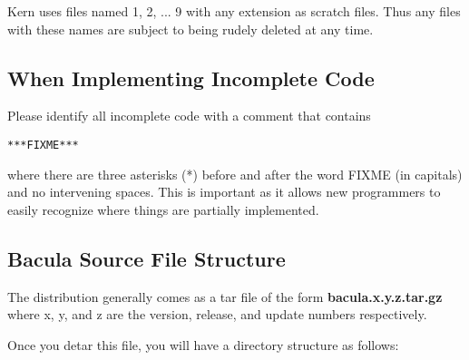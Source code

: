 Kern uses files named 1, 2, ... 9 with any extension as scratch files. Thus
any files with these names are subject to being rudely deleted at any time.

\subsection{When Implementing Incomplete Code}

Please identify all incomplete code with a comment that contains

\begin{verbatim}
***FIXME***
\end{verbatim}

where there are three asterisks (*) before and after the word
FIXME (in capitals) and no intervening spaces. This is important as it allows
new programmers to easily recognize where things are partially implemented.

\subsection{Bacula Source File Structure}

The distribution generally comes as a tar file of the form {\bf
bacula.x.y.z.tar.gz} where x, y, and z are the version, release, and update
numbers respectively.

Once you detar this file, you will have a directory structure as follows:

